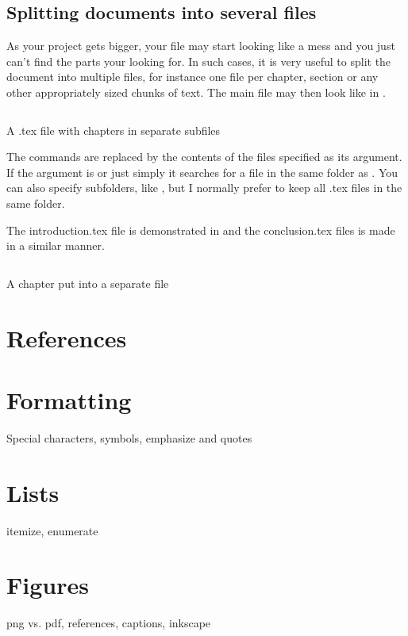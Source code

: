 \subsection{Splitting documents into several files}
As your project gets bigger, your  file may start looking like a mess and you just can't find the parts your looking for. In such cases, it is very useful to split the document into multiple files, for instance one file per chapter, section or any other appropriately sized chunks of text. The main file may then look like in .

\begin{listing}
	\inputminted{latex}{latex/multifiles.tex}
	\caption{A .tex file with chapters in separate subfiles}
	\label{lst:latex:multifiles}
\end{listing}

The \latexin{} commands are replaced by the contents of the files specified as its argument. If the argument is  or just simply  it searches for a file  in the same folder as . You can also specify subfolders, like , but I normally prefer to keep all .tex files in the same folder.

The introduction.tex file is demonstrated in  and the conclusion.tex files is made in a similar manner.

\begin{listing}
	\inputminted{latex}{latex/introduction.tex}
	\caption{A chapter put into a separate file}
	\label{lst:latex:introduction}
\end{listing}

\section{References}

\section{Formatting}
Special characters, symbols, emphasize and quotes

\section{Lists}
itemize, enumerate

\section{Figures}
png vs. pdf, references, captions, inkscape

